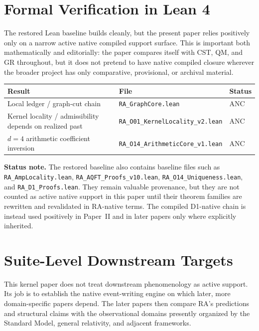 \documentclass[11pt]{article}
\begin{document}
\section{Formal Verification in Lean 4}
\label{sec:lean}

The restored Lean baseline builds cleanly, but the present paper relies positively only on a narrow active native compiled support surface. This is important both mathematically and editorially: the paper compares itself with CST, QM, and GR throughout, but it does not pretend to have native compiled closure wherever the broader project has only comparative, provisional, or archival material.

\begin{center}
\begin{tabular}{lll}
\toprule
Result & File & Status \\
\midrule
Local ledger / graph-cut chain & \texttt{RA\_GraphCore.lean} & ANC \\
Kernel locality / admissibility depends on realized past & \texttt{RA\_O01\_KernelLocality\_v2.lean} & ANC \\
$d=4$ arithmetic coefficient inversion & \texttt{RA\_O14\_ArithmeticCore\_v1.lean} & ANC \\
\bottomrule
\end{tabular}
\end{center}

\noindent\textbf{Status note.} The restored baseline also contains baseline files such as \texttt{RA\_AmpLocality.lean}, \texttt{RA\_AQFT\_Proofs\_v10.lean}, \texttt{RA\_O14\_Uniqueness.lean}, and \texttt{RA\_D1\_Proofs.lean}. They remain valuable provenance, but they are not counted as active native support in this paper until their theorem families are rewritten and revalidated in RA-native terms. The compiled D1-native chain is instead used positively in Paper~II and in later papers only where explicitly inherited.

\section{Suite-Level Downstream Targets}
\label{sec:predictions}

This kernel paper does not treat downstream phenomenology as active support. Its job is to establish the native event-writing engine on which later, more domain-specific papers depend. The later papers then compare RA's predictions and structural claims with the observational domains presently organized by the Standard Model, general relativity, and adjacent frameworks.
\end{document}
